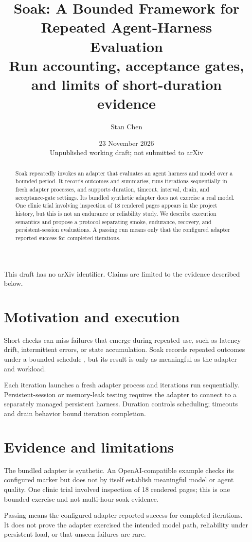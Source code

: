 \documentclass[11pt]{article}
\title{Soak: A Bounded Framework for Repeated Agent-Harness Evaluation\\\large Run accounting, acceptance gates, and limits of short-duration evidence}
\author{Stan Chen}
\date{23 November 2026\\[4pt]\small Unpublished working draft; not submitted to arXiv}
\begin{document}
\maketitle
\begin{center}\small This draft has no arXiv identifier. Claims are limited to the evidence described below.\end{center}
\begin{abstract}
Soak repeatedly invokes an adapter that evaluates an agent harness and model over a bounded period. It records outcomes and summaries, runs iterations sequentially in fresh adapter processes, and supports duration, timeout, interval, drain, and acceptance-gate settings. Its bundled synthetic adapter does not exercise a real model. One clinic trial involving inspection of 18 rendered pages appears in the project history, but this is not an endurance or reliability study. We describe execution semantics and propose a protocol separating smoke, endurance, recovery, and persistent-session evaluations. A passing run means only that the configured adapter reported success for completed iterations.
\end{abstract}
\section{Motivation and execution}
Short checks can miss failures that emerge during repeated use, such as latency drift, intermittent errors, or state accumulation. Soak records repeated outcomes under a bounded schedule \cite{r1}, but its result is only as meaningful as the adapter and workload.\par
Each iteration launches a fresh adapter process and iterations run sequentially. Persistent-session or memory-leak testing requires the adapter to connect to a separately managed persistent harness. Duration controls scheduling; timeouts and drain behavior bound iteration completion.\par
\section{Evidence and limitations}
The bundled adapter is synthetic. An OpenAI-compatible example checks its configured marker but does not by itself establish meaningful model or agent quality. One clinic trial involved inspection of 18 rendered pages; this is one bounded exercise and not multi-hour soak evidence.\par
Passing means the configured adapter reported success for completed iterations. It does not prove the adapter exercised the intended model path, reliability under persistent load, or that unseen failures are rare.\par
\end{document}
